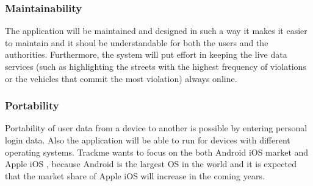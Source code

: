 \subsubsection{Maintainability}
The application will be maintained and designed in such a way it makes it easier to maintain and it shoul be understandable for both the users and the authorities. Furthermore, the system will put eﬀort in keeping the live data services (such as highlighting the streets with the highest frequency of violations or the vehicles that commit the most violation) always online.
\subsubsection{Portability}
Portability of user data from a device to another is possible by entering personal login data. Also the application will be able to run for devices with different operating systems. Trackme wants to focus on the both Android iOS market and Apple iOS , because Android is the largest OS in the world and it is expected that the market share of Apple iOS will increase in the coming years.
